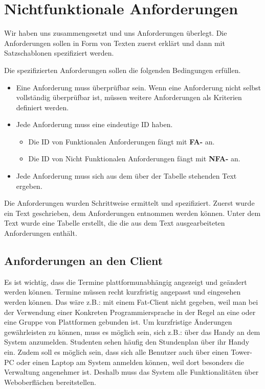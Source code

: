 
\clearpage

\section{Nichtfunktionale Anforderungen}
Wir haben uns zusammengesetzt und uns Anforderungen überlegt. Die Anforderungen sollen in Form von Texten zuerst erklärt und dann mit Satzschablonen spezifiziert werden. 

\vspace{6pt}

Die spezifizierten Anforderungen sollen die folgenden Bedingungen erfüllen.
\begin{itemize}
	\item Eine Anforderung muss überprüfbar sein. Wenn eine Anforderung nicht selbst vollständig überprüfbar ist, müssen weitere Anforderungen als Kriterien definiert werden.
	\item Jede Anforderung muss eine eindeutige ID haben. 
	\begin{itemize}
		\item Die ID von Funktionalen Anforderungen fängt mit \textbf{FA-} an.
		\item Die ID von Nicht Funktionalen Anforderungen fängt mit \textbf{NFA-} an.
	\end{itemize}
	\item Jede Anforderung muss sich aus dem über der Tabelle stehenden Text ergeben.
\end{itemize}

Die Anforderungen wurden Schrittweise ermittelt und spezifiziert. Zuerst wurde ein Text geschrieben, dem Anforderungen entnommen werden können. Unter dem Text wurde eine Tabelle erstellt, die die aus dem Text ausgearbeiteten Anforderungen enthält.

\newpage

\subsection{Anforderungen an den Client}
Es ist wichtig, dass die Termine plattformunabhängig angezeigt und geändert werden können. Termine müssen recht kurzfristig angepasst und eingesehen werden können. Das wäre z.B.: mit einem Fat-Client nicht gegeben, weil man bei der Verwendung einer Konkreten Programmiersprache in der Regel an eine oder eine Gruppe von Plattformen gebunden ist. Um kurzfristige Änderungen gewährleisten zu können, muss es möglich sein, sich z.B.: über das Handy an dem System anzumelden. Studenten sehen häufig den Stundenplan über ihr Handy ein. Zudem soll es möglich sein, dass sich alle Benutzer auch über einen Tower-PC oder einen Laptop am System anmelden können, weil dort besonders die Verwaltung angenehmer ist. Deshalb muss das System alle Funktionalitäten über Weboberflächen bereitstellen.

